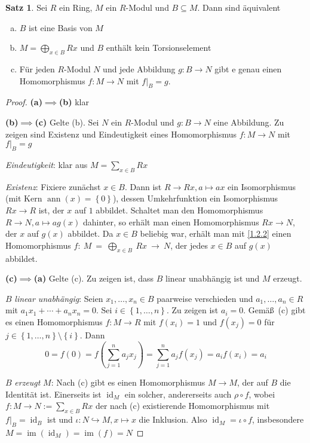 \documentclass[
twoside=semi,
fontsize=12,
DIV=12, 
cleardoublepage=current,
leqno,
headings=optiontoheadandtoc, 
toc=idx
]{scrbook}
\newcommand{\brac}[1]{\left( #1 \right)}
\newcommand{\set}[1]{\left\{ #1 \right\}}
\DeclareMathOperator{\im}{im}
\DeclareMathOperator{\ann}{ann}
\DeclareMathOperator{\id}{id}
\theoremstyle{definition}
\newtheorem{satz}[definition]{Satz}
\begin{document}
	\begin{satz}\label{1.2.5}\hfill\newline
		Sei $R$ ein Ring, $M$ ein $R$-Modul und $B \subseteq M$. Dann sind \"aquivalent
		\begin{enumerate}[(a)]
			\item $B$ ist eine Basis von $M$
			\item $\displaystyle M = \bigoplus_{x \in B} Rx$ und $B$ enth\"alt kein Torsionselement
			\item F\"ur jeden $R$-Modul $N$ und jede Abbildung $g:B \to N$ gibt e genau einen Homomorphismus $f:M \to N$ mit $f\big|_B = g$.
		\end{enumerate}
	
		\begin{proof}\hfill\newline
			\textbf{(a)$\implies$(b)} klar
			
			\medskip\noindent
			\textbf{(b)$\implies$(c)} Gelte (b). Sei $N$ ein $R$-Modul und $g:B \to N$ eine Abbildung. Zu zeigen sind Existenz und Eindeutigkeit eines Homomorphismus $f: M \to N$ mit $f\big|_B = g$

			\noindent \emph{Eindeutigkeit}: klar aus $\displaystyle M = \sum_{x \in B} Rx$
					
			\noindent \emph{Existenz}: Fixiere zun\"achst $x \in B$. Dann ist $R \to Rx, a \mapsto ax$ ein Isomorphismus (mit Kern $\ann(x) = \set{0}$), dessen Umkehrfunktion ein Isomorphismus $Rx \to R$ ist, der $x$ auf $1$ abbildet. Schaltet man den Homomorphismus $R \to N, a \mapsto ag(x)$ dahinter, so erh\"alt man einen Homomorphismus $Rx \to N$, der $x$ auf $g(x)$ abbildet. Da $x \in B$ beliebig war, erh\"alt man mit \ref{1.2.2} einen Homomorphismus $\displaystyle f:~M~=~\bigoplus_{x \in B}~Rx~\to~N$, der jedes $x \in B$ auf $g(x)$ abbildet.  
			
			\medskip\noindent
			\textbf{(c)$\implies$(a)}
			Gelte (c). Zu zeigen ist, dass $B$ linear unabh\"angig ist und $M$ erzeugt.
				
			\noindent $B$ \emph{linear unabh\"angig}: Seien $x_1, \dots, x_n \in B$ paarweise verschieden und $a_1, \dots, a_n \in R$ mit $a_1x_1 + \cdots + a_nx_n = 0$. Sei $i \in \set{1, \dots, n}$. Zu zeigen ist $a_i = 0$. Gem\"a\ss\ (c) gibt es einen Homomorphismus $f: M \to R$ mit $f(x_i) = 1$ und $f(x_j) = 0$ f\"ur $j \in \set{1, \dots, n} \setminus \set{i}$.
			Dann \[0 = f(0) = f\brac{\sum_{j=1}^n a_jx_j} = \sum_{j=1}^n a_jf(x_j) = a_if(x_i) = a_i\]
				
			\noindent $B$ \emph{erzeugt} $M$: Nach (c) gibt es einen Homomorphismus $M \to M$, der auf $B$ die Identit\"at ist. Einerseits ist $\id_M$ ein solcher, andererseits auch $\rho \circ f$, wobei $\displaystyle f: M \to N:= \sum_{x \in B} Rx$ der nach (c) existierende Homomorphismus mit $f\big|_{B} = \id_B$ ist und $\iota: N \hookrightarrow M, x \mapsto x$ die Inklusion. Also $\id_M = \iota \circ f$, insbesondere $M = \im(\id_M) = \im(f) = N$
		\end{proof}
	\end{satz}
\end{document}
